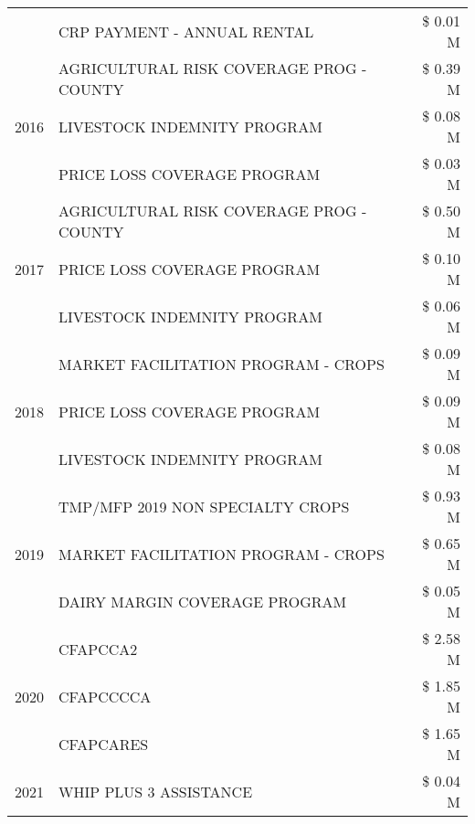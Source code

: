 \begin{tabular}{llr}
 & CRP PAYMENT - ANNUAL RENTAL & \$ 0.01 M \\
\cline{1-3}
\multirow[t]{3}{*}{2016} & AGRICULTURAL RISK COVERAGE PROG - COUNTY & \$ 0.39 M \\
 & LIVESTOCK INDEMNITY PROGRAM & \$ 0.08 M \\
 & PRICE LOSS COVERAGE PROGRAM & \$ 0.03 M \\
\cline{1-3}
\multirow[t]{3}{*}{2017} & AGRICULTURAL RISK COVERAGE PROG - COUNTY & \$ 0.50 M \\
 & PRICE LOSS COVERAGE PROGRAM & \$ 0.10 M \\
 & LIVESTOCK INDEMNITY PROGRAM & \$ 0.06 M \\
\cline{1-3}
\multirow[t]{3}{*}{2018} & MARKET FACILITATION PROGRAM - CROPS & \$ 0.09 M \\
 & PRICE LOSS COVERAGE PROGRAM & \$ 0.09 M \\
 & LIVESTOCK INDEMNITY PROGRAM & \$ 0.08 M \\
\cline{1-3}
\multirow[t]{3}{*}{2019} & TMP/MFP 2019 NON SPECIALTY CROPS & \$ 0.93 M \\
 & MARKET FACILITATION PROGRAM - CROPS & \$ 0.65 M \\
 & DAIRY MARGIN COVERAGE PROGRAM & \$ 0.05 M \\
\cline{1-3}
\multirow[t]{3}{*}{2020} & CFAPCCA2 & \$ 2.58 M \\
 & CFAPCCCCA & \$ 1.85 M \\
 & CFAPCARES & \$ 1.65 M \\
\cline{1-3}
2021 & WHIP PLUS 3 ASSISTANCE & \$ 0.04 M \\
\cline{1-3}
\bottomrule
\end{tabular}
